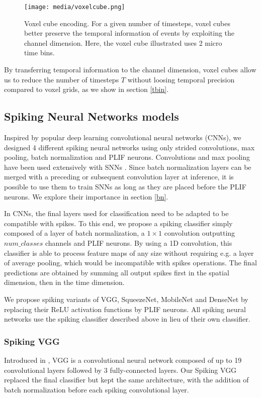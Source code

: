 \documentclass[conference]{IEEEtran}
\begin{document}
\begin{figure}[tb]
\centerline{\texttt{[image: media/voxelcube.png]}}
\caption{Voxel cube encoding. For a given number of timesteps, voxel cubes better preserve the temporal information of events by exploiting the channel dimension. Here, the voxel cube illustrated uses 2 micro time bins.}
\label{fig:voxelcube}
\end{figure}

By transferring temporal information to the channel dimension, voxel cubes allow us to reduce the number of timesteps $T$ without loosing temporal precision compared to voxel grids, as we show in section \ref{tbin}.

\subsection{Spiking Neural Networks models}

Inspired by popular deep learning convolutional neural networks (CNNs), we designed 4 different spiking neural networks using only strided convolutions, max pooling, batch normalization and PLIF neurons. Convolutions and max pooling have been used extensively with SNNs \cite{loicijcnn} \cite{pool}. Since batch normalization layers can be merged with a preceding or subsequent convolution layer at inference, it is possible to use them to train SNNs as long as they are placed before the PLIF neurons. We explore their importance in section \ref{bn}. 

In CNNs, the final layers used for classification need to be adapted to be compatible with spikes. To this end, we propose a spiking classifier simply composed of a layer of batch normalization, a $1\times 1$ convolution outputting $num\_classes$ channels and PLIF neurons. By using a 1D convolution, this classifier is able to process feature maps of any size without requiring e.g. a layer of average pooling, which would be incompatible with spikes operations. The final predictions are obtained by summing all output spikes first in the spatial dimension, then in the time dimension. 

We propose spiking variants of VGG, SqueezeNet, MobileNet and DenseNet by replacing their ReLU activation functions by PLIF neurons. All spiking neural networks use the spiking classifier described above in lieu of their own classifier. \\





\subsubsection{Spiking VGG} 
Introduced in \cite{vgg}, VGG is a convolutional neural network composed of up to 19 convolutional layers followed by 3 fully-connected layers. Our Spiking VGG replaced the final classifier but kept the same architecture, with the addition of batch normalization before each spiking convolutional layer. \\
\end{document}
